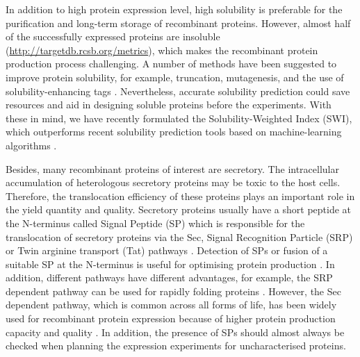 In addition to high protein expression level, high solubility is
preferable for the purification and long-term storage of recombinant
proteins. However, almost half of the successfully expressed proteins
are insoluble
(\href{http://targetdb.rcsb.org/metrics}{http://targetdb.rcsb.org/metrics}),
which makes the recombinant protein production process challenging. A
number of methods have been suggested to improve protein solubility, for
example, truncation, mutagenesis, and the use of solubility-enhancing
tags \cite{Chan2010-mo,Costa2014-oe,Esposito2006-tj,Waldo2003-ui}. 
Nevertheless, accurate solubility prediction could save
resources and aid in designing soluble proteins before the experiments.
With these in mind, we have recently formulated the Solubility-Weighted
Index (SWI), which outperforms recent solubility prediction tools based
on machine-learning algorithms
\cite{Bhandari2020-pz}.

Besides, many recombinant proteins of interest are secretory. The
intracellular accumulation of heterologous secretory proteins may be
toxic to the host cells. Therefore, the translocation efficiency of
these proteins plays an important role in the yield quantity and
quality. Secretory proteins usually have a short peptide at the
N-terminus called Signal Peptide (SP) which is responsible for the 
translocation of secretory proteins via the Sec, Signal Recognition Particle
(SRP) or Twin arginine transport (Tat) pathways
\cite{Luirink1994-br,Palmer2012-cw,Rusch2007-it,Von_Heijne1990-sb}.
Detection of SPs or fusion of a suitable SP at the N-terminus is useful
for optimising protein production
\cite{Freudl2018-lr,Karyolaimos2020-gg,Rosano2019-sj,Zamani2015-xj}. In
addition, different pathways have different advantages, for example, the
SRP dependent pathway can be used for rapidly folding proteins
\cite{Owji2018-hg}. However, the Sec dependent
pathway, which is common across all forms of life, has been widely used
for recombinant protein expression because of higher protein production
capacity and quality
\cite{Ma2018-iz,Owji2018-hg}. In addition, the
presence of SPs should almost always be checked when planning the
expression experiments for uncharacterised proteins.


